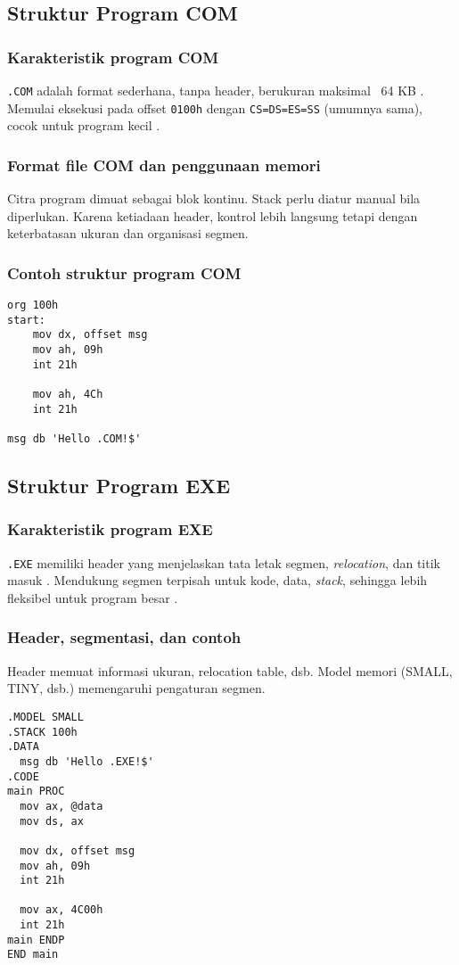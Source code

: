 \subsection{Struktur Program COM}
\subsubsection{Karakteristik program COM}
\texttt{.COM} adalah format sederhana, tanpa header, berukuran maksimal ~64 KB \cite{borland1990tasm}. Memulai eksekusi pada offset \texttt{0100h} dengan \texttt{CS=DS=ES=SS} (umumnya sama), cocok untuk program kecil \cite{nopi2003tutorial}.

\subsubsection{Format file COM dan penggunaan memori}
Citra program dimuat sebagai blok kontinu. Stack perlu diatur manual bila diperlukan. Karena ketiadaan header, kontrol lebih langsung tetapi dengan keterbatasan ukuran dan organisasi segmen.

\subsubsection{Contoh struktur program COM}
\begin{verbatim}
org 100h
start:
    mov dx, offset msg
    mov ah, 09h
    int 21h

    mov ah, 4Ch
    int 21h

msg db 'Hello .COM!$'
\end{verbatim}

\subsection{Struktur Program EXE}
\subsubsection{Karakteristik program EXE}
\texttt{.EXE} memiliki header yang menjelaskan tata letak segmen, \textit{relocation}, dan titik masuk \cite{borland1990tasm}. Mendukung segmen terpisah untuk kode, data, \textit{stack}, sehingga lebih fleksibel untuk program besar \cite{nopi2003tutorial}.

\subsubsection{Header, segmentasi, dan contoh}
Header memuat informasi ukuran, relocation table, dsb. Model memori (SMALL, TINY, dsb.) memengaruhi pengaturan segmen.
\begin{verbatim}
.MODEL SMALL
.STACK 100h
.DATA
  msg db 'Hello .EXE!$'
.CODE
main PROC
  mov ax, @data
  mov ds, ax

  mov dx, offset msg
  mov ah, 09h
  int 21h

  mov ax, 4C00h
  int 21h
main ENDP
END main
\end{verbatim}

